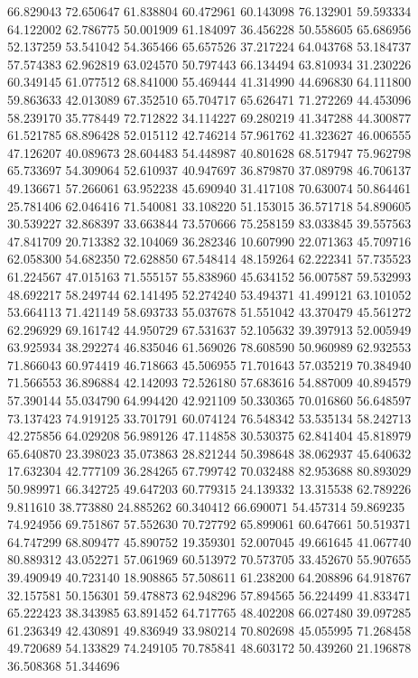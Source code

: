 66.829043
72.650647
61.838804
60.472961
60.143098
76.132901
59.593334
64.122002
62.786775
50.001909
61.184097
36.456228
50.558605
65.686956
52.137259
53.541042
54.365466
65.657526
37.217224
64.043768
53.184737
57.574383
62.962819
63.024570
50.797443
66.134494
63.810934
31.230226
60.349145
61.077512
68.841000
55.469444
41.314990
44.696830
64.111800
59.863633
42.013089
67.352510
65.704717
65.626471
71.272269
44.453096
58.239170
35.778449
72.712822
34.114227
69.280219
41.347288
44.300877
61.521785
68.896428
52.015112
42.746214
57.961762
41.323627
46.006555
47.126207
40.089673
28.604483
54.448987
40.801628
68.517947
75.962798
65.733697
54.309064
52.610937
40.947697
36.879870
37.089798
46.706137
49.136671
57.266061
63.952238
45.690940
31.417108
70.630074
50.864461
25.781406
62.046416
71.540081
33.108220
51.153015
36.571718
54.890605
30.539227
32.868397
33.663844
73.570666
75.258159
83.033845
39.557563
47.841709
20.713382
32.104069
36.282346
10.607990
22.071363
45.709716
62.058300
54.682350
72.628850
67.548414
48.159264
62.222341
57.735523
61.224567
47.015163
71.555157
55.838960
45.634152
56.007587
59.532993
48.692217
58.249744
62.141495
52.274240
53.494371
41.499121
63.101052
53.664113
71.421149
58.693733
55.037678
51.551042
43.370479
45.561272
62.296929
69.161742
44.950729
67.531637
52.105632
39.397913
52.005949
63.925934
38.292274
46.835046
61.569026
78.608590
50.960989
62.932553
71.866043
60.974419
46.718663
45.506955
71.701643
57.035219
70.384940
71.566553
36.896884
42.142093
72.526180
57.683616
54.887009
40.894579
57.390144
55.034790
64.994420
42.921109
50.330365
70.016860
56.648597
73.137423
74.919125
33.701791
60.074124
76.548342
53.535134
58.242713
42.275856
64.029208
56.989126
47.114858
30.530375
62.841404
45.818979
65.640870
23.398023
35.073863
28.821244
50.398648
38.062937
45.640632
17.632304
42.777109
36.284265
67.799742
70.032488
82.953688
80.893029
50.989971
66.342725
49.647203
60.779315
24.139332
13.315538
62.789226
9.811610
38.773880
24.885262
60.340412
66.690071
54.457314
59.869235
74.924956
69.751867
57.552630
70.727792
65.899061
60.647661
50.519371
64.747299
68.809477
45.890752
19.359301
52.007045
49.661645
41.067740
80.889312
43.052271
57.061969
60.513972
70.573705
33.452670
55.907655
39.490949
40.723140
18.908865
57.508611
61.238200
64.208896
64.918767
32.157581
50.156301
59.478873
62.948296
57.894565
56.224499
41.833471
65.222423
38.343985
63.891452
64.717765
48.402208
66.027480
39.097285
61.236349
42.430891
49.836949
33.980214
70.802698
45.055995
71.268458
49.720689
54.133829
74.249105
70.785841
48.603172
50.439260
21.196878
36.508368
51.344696
